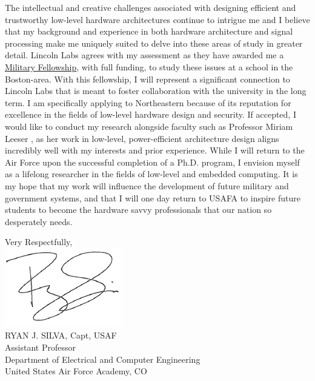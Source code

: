 \documentclass{article}
\begin{document}
The intellectual and creative challenges associated with designing efficient
 and trustworthy low-level hardware architectures continue to intrigue me and I believe that my
background and experience in both hardware architecture and signal processing make
me uniquely suited to delve into these areas of study in greater detail.
Lincoln Labs agrees with my assessment as they have awarded me a
\href{http://www.ll.mit.edu/college/fellowsprograms.html}{Military Fellowship},
with full funding, to study these issues at a school in the Boston-area. With
this fellowship, I will represent a significant connection to Lincoln Labs that
is meant to foster collaboration with the university in the long term. I am
specifically applying to Northeastern because of its reputation for excellence in
the fields of low-level hardware design and security. If accepted, I would like
to conduct my research alongside faculty such as Professor Miriam Leeser 
, as her work in low-level, power-efficient architecture
design aligns incredibly well with my interests and prior experience. While I
will return to the Air Force upon the successful completion of a Ph.D. program,
I envision myself as a lifelong researcher in the fields of low-level and
embedded computing. It is my hope that my work will influence the development
of future military and government systems, and that I will one day return to
USAFA to inspire future students to become the hardware savvy professionals
that our nation so desperately needs.

\vspace{2mm}
\hspace*{2.3in} \noindent Very Respectfully, \\
\hspace*{2.5in} \includegraphics[scale=.5]{silvasig}  \\
\hspace*{2.5in} RYAN J. SILVA, Capt, USAF \\
\hspace*{2.5in} Assistant Professor   \\
\hspace*{2.5in} Department of Electrical and Computer Engineering  \\
\hspace*{2.5in} United States Air Force Academy, CO  
\end{document}
